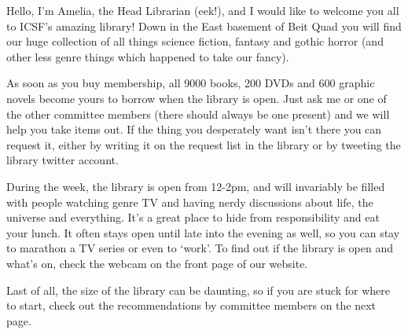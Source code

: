 Hello, I'm Amelia, the Head Librarian (eek!), and I would like to welcome you all to ICSF's amazing library! Down in the East basement of Beit Quad you will find our huge collection of all things science fiction, fantasy and gothic horror (and other less genre things which happened to take our fancy). 

As soon as you buy membership, all 9000 books, 200 DVDs and 600 graphic novels become yours to borrow when the library is open. Just ask me or one of the other committee members (there should always be one present) and we will help you take items out. If the thing you desperately want isn't there you can request it, either by writing it on the request list in the library or by tweeting the library twitter account. 

During the week, the library is open from 12-2pm, and will invariably be filled with people watching genre TV and having nerdy discussions about life, the universe and everything. It's a great place to hide from responsibility and eat your lunch. It often stays open until late into the evening as well, so you can stay to marathon a TV series or even to `work'. To find out if the library is open and what's on, check the webcam on the front page of our website. 

Last of all, the size of the library can be daunting, so if you are stuck for where to start, check out the recommendations by committee members on the next page. 